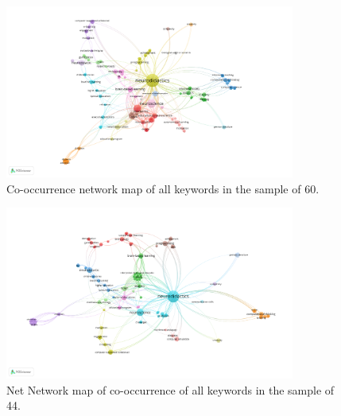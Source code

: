 \documentclass[english]{textolivre}
\begin{document}
\begin{figure}[htbp]
 \centering
 \includegraphics[width=0.85\textwidth]{Fig2.png}
 \caption{Co-occurrence network map of all keywords in the sample of 60.}
 \label{fig02}
\end{figure}

\begin{figure}[htbp]
 \centering
 \includegraphics[width=0.85\textwidth]{Fig3.png}
 \caption{Net Network map of co-occurrence of all keywords in the sample of 44.}
 \label{fig03}
\end{figure}
\end{document}
